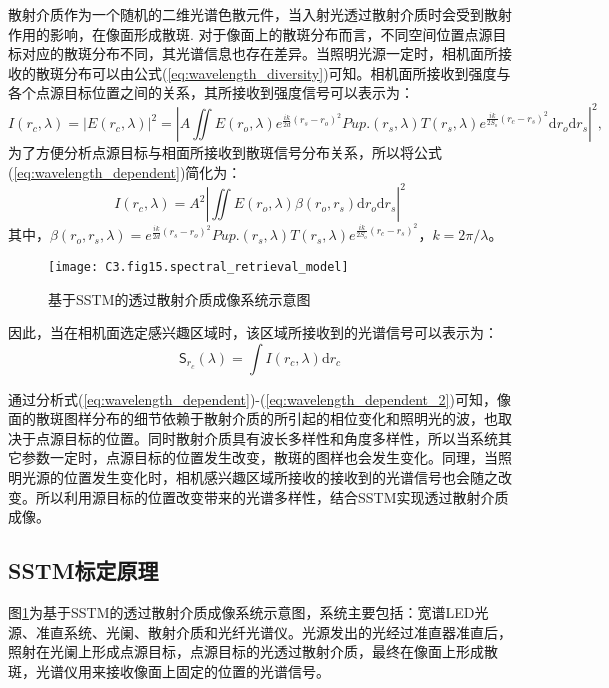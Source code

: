 散射介质作为一个随机的二维光谱色散元件，当入射光透过散射介质时会受到散射作用的影响，在像面形成散斑. 对于像面上的散斑分布而言，不同空间位置点源目标对应的散斑分布不同，其光谱信息也存在差异。当照明光源一定时，相机面所接收的散斑分布可以由公式(\ref{eq:wavelength_diversity})可知。相机面所接收到强度与各个点源目标位置之间的关系，其所接收到强度信号可以表示为：
\begin{equation}
    I(r_{c},\lambda) = |E(r_{c},\lambda)|^2 = |A\iint E(r_{o},\lambda)e^{\frac{ik}{2d}(r_{s}-r_{o})^{2}}Pup.(r_{s},\lambda)T(r_{s},\lambda)e^{\frac{ik}{2S_{o}}(r_{c}-r_{s})^{2}}\mathrm{d}{r_{o}}\mathrm{d}{r_{s}}|^2
\label{eq:wavelength_dependent},
\end{equation}
为了方便分析点源目标与相面所接收到散斑信号分布关系，所以将公式(\ref{eq:wavelength_dependent})简化为：
\begin{equation}
    I(r_{c},\lambda) = A^2|\iint E(r_{o},\lambda) \beta (r_o,r_s)\mathrm{d}{r_{o}}\mathrm{d}{r_{s}}|^2
\label{eq:wavelength_dependent_1}
\end{equation}
其中，$\beta(r_o,r_s,\lambda) = e^{\frac{ik}{2d}(r_{s}-r_{o})^{2}}Pup.(r_{s},\lambda)T(r_{s},\lambda)e^{\frac{ik}{2S_{o}}(r_{c}-r_{s})^{2}}$，$k=2\pi/\lambda$。
\begin{figure}[htp]
	\centering
	\texttt{[image: C3.fig15.spectral\_retrieval\_model]}
	\caption{基于SSTM的透过散射介质成像系统示意图}
	\label{fig:3.15}
\end{figure}
因此，当在相机面选定感兴趣区域时，该区域所接收到的光谱信号可以表示为：
\begin{equation}
    \mathsf{S}_{r_{c}}(\lambda) = \int I(r_{c},\lambda) \mathrm{d}{r_{c}}
\label{eq:wavelength_dependent_2}
\end{equation}

通过分析式(\ref{eq:wavelength_dependent})-(\ref{eq:wavelength_dependent_2})可知，像面的散斑图样分布的细节依赖于散射介质的所引起的相位变化和照明光的波，也取决于点源目标的位置。同时散射介质具有波长多样性和角度多样性，所以当系统其它参数一定时，点源目标的位置发生改变，散斑的图样也会发生变化。同理，当照明光源的位置发生变化时，相机感兴趣区域所接收的接收到的光谱信号也会随之改变。所以利用源目标的位置改变带来的光谱多样性，结合SSTM实现透过散射介质成像。
\subsection{SSTM标定原理}
图\ref{fig:3.15}为基于SSTM的透过散射介质成像系统示意图，系统主要包括：宽谱LED光源、准直系统、光阑、散射介质和光纤光谱仪。光源发出的光经过准直器准直后，照射在光阑上形成点源目标，点源目标的光透过散射介质，最终在像面上形成散斑，光谱仪用来接收像面上固定的位置的光谱信号。

